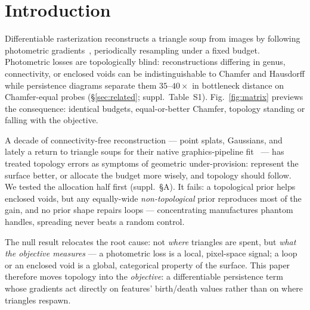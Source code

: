 \section{Introduction}
\label{sec:intro}


Differentiable rasterization reconstructs a triangle soup from images by
following photometric gradients~\citep{tojo2026diffsoup}, periodically
resampling under a fixed budget. Photometric losses are
topologically blind: reconstructions differing in genus, connectivity,
or enclosed voids can be indistinguishable to Chamfer and Hausdorff
while persistence diagrams separate them $35$--$40\times$ in bottleneck
distance on Chamfer-equal probes (\S\ref{sec:related}; suppl.\
Table~S1). Fig.~\ref{fig:matrix} previews
the consequence: identical budgets, equal-or-better Chamfer, topology
standing or falling with the objective.

A decade of connectivity-free reconstruction --- point splats,
Gaussians, and lately a return to triangle soups for their native
graphics-pipeline
fit~\citep{held2025trianglesplatting,burgdorfer2025radiant,tojo2026diffsoup}
--- has treated topology errors as symptoms of geometric
under-provision: represent the surface better, or allocate the budget
more wisely, and topology should follow. We tested the allocation half first (suppl.\ \S A).
It fails: a topological prior helps enclosed voids, but any equally-wide
\emph{non-topological} prior reproduces most of the gain, and no prior
shape repairs loops --- concentrating manufactures phantom handles,
spreading never beats a random control.

The null result relocates the root cause: not \emph{where} triangles are
spent, but \emph{what the objective measures} --- a photometric loss is
a local, pixel-space signal; a loop or an enclosed void is a global,
categorical property of the surface. This paper therefore moves topology
into the \emph{objective}: a differentiable persistence term whose
gradients act directly on features' birth/death values rather than on
where triangles respawn.

